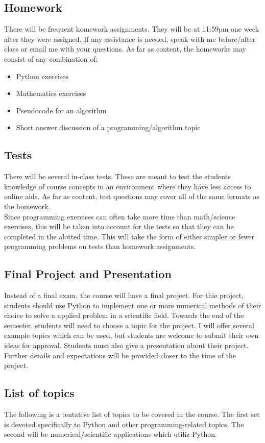 \documentclass[11pt]{article}
\begin{document}
\subsection*{Homework}
There will be frequent homework assignments. They will be at 11:59pm one week after they were assigned. If any assistance is needed, speak with me before/after class or email me with your questions. As far as content, the homeworks may consist of any combination of:
\begin{itemize}
	\setlength\itemsep{-2pt}
	\item Python exercises
	\item Mathematics exercises
	\item Pseudocode for an algorithm
	\item Short answer discussion of a programming/algorithm topic
\end{itemize}

\subsection*{Tests}
There will be several in-class tests. These are meant to test the students knowledge of course concepts in an environment where they have less access to online aids. As far as content, test questions may cover all of the same formats as the homework. \\

Since programming exercises can often take more time than math/science exercises, this will be taken into account for the tests so that they can be completed in the alotted time. This will take the form of either simpler or fewer programming problems on tests than homework assignments.

\subsection*{Final Project and Presentation}
Instead of a final exam, the course will have a final project. For thie project, students should use Python to implement one or more numerical methods of their choice to solve a applied problem in a scientific field. Towards the end of the semester, students will need to choose a topic for the project. I will offer several example topics which can be used, but students are welcome to submit their own ideas for approval. Students must also give a presentation about their project. Further details and expectations will be provided closer to the time of the project.

\subsection*{List of topics}
The following is a tentative list of topics to be covered in the course. The first set is devoted specifically to Python and other programming-related topics. The second will be numerical/scientific applications which utiliz Python. \\
\end{document}
